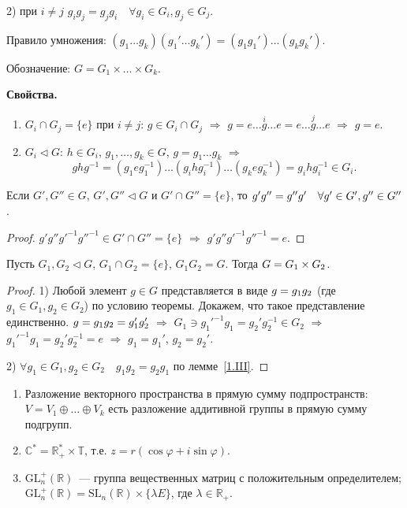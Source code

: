 \documentclass[a4paper]{article}
\newcommand{\svoy}{\vspace{5pt}\noindent\textbf{Свойства.}\vspace{-6pt}}
\newcommand*{\p}[1]{#1\nobreak\discretionary{}{\hbox{$\mathsurround=0pt #1$}}{}}
\begin{document}
2) при $i\neq j$ $g_i g_j=g_jg_i\quad \forall g_i\in G_i, g_j\in
G_j$.

Правило умножения: $(g_1\ldots g_k)(g_1'\ldots
g_k')=(g_1g_1')\ldots(g_kg_k')$.

Обозначение: $G=G_1\times\ldots\times G_k$.

\svoy
\begin{enumerate}
  \item $G_i\cap G_j=\{e\}$ при $i\neq j$: $g\in G_i\cap G_j$
  $\Rightarrow$ $g=e\ldots \stackrel{i}{g}\ldots e=e\ldots \stackrel{j}{g}\ldots
  e$ $\Rightarrow$ $g=e$.
  \item $G_i\triangleleft G$: $h\in G_i$, $g_1,\ldots,g_k\in G$, $g=g_1\ldots
  g_k$ $\Rightarrow$ $$ghg^{-1}=(g_1eg_1^{-1})\ldots(g_ihg_i^{-1})\ldots(g_keg_k^{-1})=g_ihg_i^{-1}\in
  G_i.$$
\end{enumerate}

\begin{lemma}
\label{1.III}Если $G', G''\in G$, $G',G''\triangleleft G$ и $G'\cap
G''=\{e\}$, то $g'g''\p=g''g'\quad \forall g'\in G', g''\in G''$.
\end{lemma}

\begin{proof}
$g'g''g'^{-1}g''^{-1}\in G'\cap G''=\{e\}$ $\Rightarrow$
$g'g''g'^{-1}g''^{-1}=e$.
\end{proof}

\begin{theorem}
Пусть $G_1,G_2\triangleleft G$, $G_1\cap G_2=\{e\}$, $G_1G_2=G$.
Тогда $G\p=G_1\times G_2$.
\end{theorem}

\begin{proof}
1) Любой элемент $g\in G$ представляется в виде $g\p=g_1g_2$ (где
$g_1\in G_1, g_2\in G_2$) по условию теоремы. Докажем, что такое
представление единственно. $g\p=g_1g_2=g_1'g_2'$ $\Rightarrow$
$G_1\ni g_1'^{-1}g_1=g_2'g_2^{-1}\in G_2$ $\Rightarrow$
$g_1'^{-1}g_1=g_2'g_2^{-1}=e$ $\Rightarrow$ $g_1=g_1'$, $g_2=g_2'$.

2) $\forall g_1\in G_1, g_2\in G_2\quad g_1g_2=g_2g_1$ по
лемме~\ref{1.III}.
\end{proof}

\begin{ex}
\begin{enumerate}
  \item Разложение векторного пространства в прямую сумму
  подпространств: $V=V_1\oplus \ldots\oplus V_k$ есть разложение
  аддитивной группы в прямую сумму подгрупп.
  \item $\mathbb{C}^*=\mathbb{R}^*_+\times \mathbb{T}$, т.е.
  $z=r(\cos\varphi+i\sin\varphi)$.
  \item $\mathrm{GL}_n^+(\mathbb{R})$~--- группа вещественных матриц с
  положительным определителем; $\mathrm{GL}_n^+(\mathbb{R})=\mathrm{SL}_n(\mathbb{R})\times\{\lambda
  E\}$, где $\lambda\in \mathbb{R}_+$.
\end{enumerate}
\end{ex}
\end{document}
